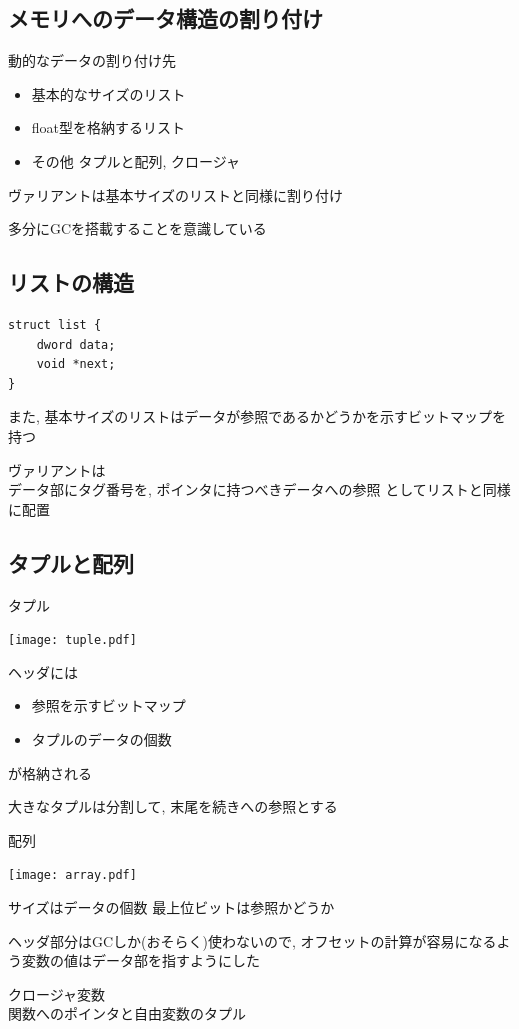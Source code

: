 \documentclass[papersize,30pt,slide]{jsarticle}
\begin{document}
\subsection{メモリへのデータ構造の割り付け}
動的なデータの割り付け先
\begin{itemize}
\item 基本的なサイズのリスト
\item float型を格納するリスト
\item その他 タプルと配列, クロージャ
\end{itemize}
ヴァリアントは基本サイズのリストと同様に割り付け

多分にGCを搭載することを意識している

\newpage
\subsection{リストの構造}
\begin{verbatim}
struct list {
    dword data;
    void *next;
}
\end{verbatim}
また, 基本サイズのリストはデータが参照であるかどうかを示すビットマップを持つ

\vspace{1em}

ヴァリアントは \\
データ部にタグ番号を, ポインタに持つべきデータへの参照
としてリストと同様に配置

\newpage
\subsection{タプルと配列}
タプル

\texttt{[image: tuple.pdf]}

ヘッダには
\begin{itemize}
\item 参照を示すビットマップ
\item タプルのデータの個数
\end{itemize}
が格納される

大きなタプルは分割して, 末尾を続きへの参照とする

\newpage

配列

\texttt{[image: array.pdf]}

サイズはデータの個数 最上位ビットは参照かどうか

\vspace{1em}

ヘッダ部分はGCしか(おそらく)使わないので, オフセットの計算が容易になるよう変数の値はデータ部を指すようにした

\vspace{1em}

クロージャ変数 \\
関数へのポインタと自由変数のタプル
\end{document}
